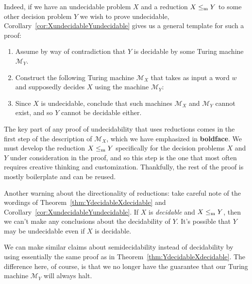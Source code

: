 Indeed, if we have an undecidable problem $X$ and a reduction $X \leq_{\mathrm{m}} Y$ to some other decision problem $Y$ we wish to prove undecidable, Corollary~\ref{cor:XundecidableYundecidable} gives us a general template for such a proof:
\begin{colouredbox}
\begin{enumerate}
\item Assume by way of contradiction that $Y$ is decidable by some Turing machine $\mathcal{M}_{Y}$.
\item Construct the following Turing machine $\mathcal{M}_{X}$ that takes as input a word $w$ and supposedly decides $X$ using the machine $\mathcal{M}_{Y}$:
\item Since $X$ is undecidable, conclude that such machines $\mathcal{M}_{X}$ and $\mathcal{M}_{Y}$ cannot exist, and so $Y$ cannot be decidable either.
\end{enumerate}
\end{colouredbox}
\noindent
The key part of any proof of undecidability that uses reductions comes in the first step of the description of $\mathcal{M}_{X}$, which we have emphasized in \textbf{boldface}. We must develop the reduction $X \leq_{\mathrm{m}} Y$ specifically for the decision problems $X$ and $Y$ under consideration in the proof, and so this step is the one that most often requires creative thinking and customization. Thankfully, the rest of the proof is mostly boilerplate and can be reused.

\begin{dangerous}
Another warning about the directionality of reductions: take careful note of the wordings of Theorem~\ref{thm:YdecidableXdecidable} and Corollary~\ref{cor:XundecidableYundecidable}. If $X$ is \emph{decidable} and $X \leq_{\mathrm{m}} Y$, then we can't make any conclusions about the decidability of $Y$. It's possible that $Y$ may be undecidable even if $X$ is decidable.
\end{dangerous}

We can make similar claims about semidecidability instead of decidability by using essentially the same proof as in Theorem~\ref{thm:YdecidableXdecidable}. The difference here, of course, is that we no longer have the guarantee that our Turing machine $\mathcal{M}_{Y}$ will always halt.

